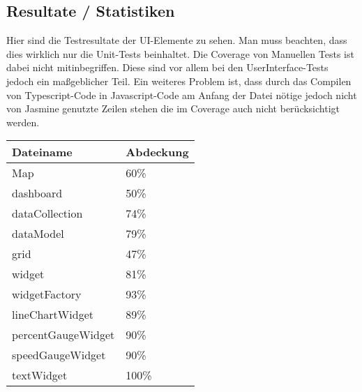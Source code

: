 \documentclass[qualitaetssicherung.tex]{subfiles}
\begin{document}
\subsection*{Resultate / Statistiken}
	Hier sind die Testresultate der UI-Elemente zu sehen.
	Man muss beachten, dass dies wirklich nur die Unit-Tests beinhaltet. Die Coverage von Manuellen Tests ist dabei nicht mitinbegriffen. Diese sind vor allem bei den UserInterface-Tests jedoch ein maßgeblicher Teil.
	Ein weiteres Problem ist, dass durch das Compilen von Typescript-Code in Javascript-Code am Anfang der Datei nötige jedoch nicht von Jasmine genutzte Zeilen stehen die im Coverage auch nicht berücksichtigt werden.
	\begin{center}
		\begin{tabular}{| l | l }
			\hline
			Dateiname & Abdeckung \\ \hline
			Map 			&  60\% \\ \hline
			dashboard 		&  50\% \\ \hline
			dataCollection 	&  74\% \\ \hline
			dataModel    	&  79\% \\ \hline
			grid		 	&  47\% \\ \hline
			widget		 	&  81\% \\ \hline
			widgetFactory 	&  93\% \\ \hline
			lineChartWidget &  89\% \\ \hline
			percentGaugeWidget 	&  90\% \\ \hline
			speedGaugeWidget 	&  90\% \\ \hline
			textWidget  	& 100\% \\ \hline
			\hline
		\end{tabular}
	\end{center}
	
\end{document}
